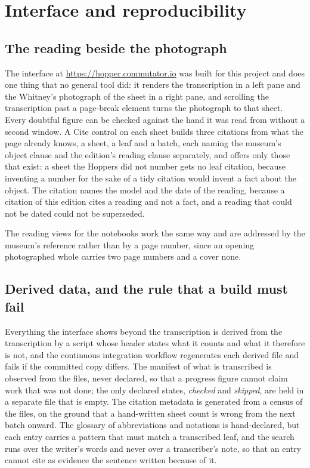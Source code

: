 \documentclass[11pt]{article}
\begin{document}
\section{Interface and reproducibility}

\subsection{The reading beside the photograph}

The interface at \url{https://hopper.commutator.io} was built for this project and does one thing that no general tool did: it renders the transcription in a left pane and the Whitney's photograph of the sheet in a right pane, and scrolling the transcription past a page-break element turns the photograph to that sheet. Every doubtful figure can be checked against the hand it was read from without a second window. A Cite control on each sheet builds three citations from what the page already knows, a sheet, a leaf and a batch, each naming the museum's object clause and the edition's reading clause separately, and offers only those that exist: a sheet the Hoppers did not number gets no leaf citation, because inventing a number for the sake of a tidy citation would invent a fact about the object. The citation names the model and the date of the reading, because a citation of this edition cites a reading and not a fact, and a reading that could not be dated could not be superseded.

The reading views for the notebooks work the same way and are addressed by the museum's reference rather than by a page number, since an opening photographed whole carries two page numbers and a cover none.

\subsection{Derived data, and the rule that a build must fail}

Everything the interface shows beyond the transcription is derived from the transcription by a script whose header states what it counts and what it therefore is not, and the continuous integration workflow regenerates each derived file and fails if the committed copy differs. The manifest of what is transcribed is observed from the files, never declared, so that a progress figure cannot claim work that was not done; the only declared states, \emph{checked} and \emph{skipped}, are held in a separate file that is empty. The citation metadata is generated from a census of the files, on the ground that a hand-written sheet count is wrong from the next batch onward. The glossary of abbreviations and notations is hand-declared, but each entry carries a pattern that must match a transcribed leaf, and the search runs over the writer's words and never over a transcriber's note, so that an entry cannot cite as evidence the sentence written because of it.
\end{document}
